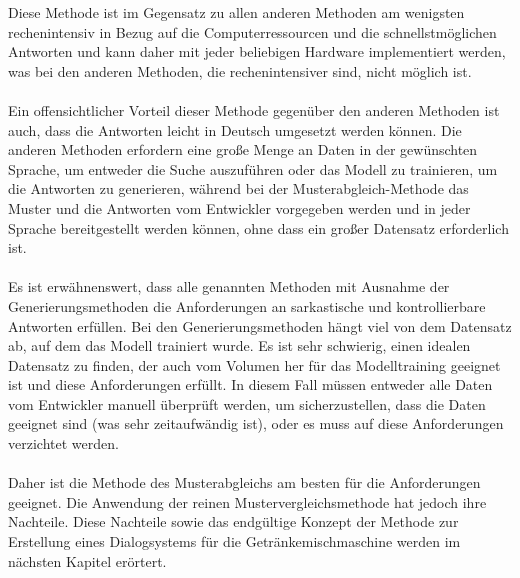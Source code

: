 Diese Methode ist im Gegensatz zu allen anderen Methoden am wenigsten rechenintensiv in Bezug auf die Computerressourcen und die schnellstmöglichen Antworten und kann daher mit jeder beliebigen Hardware implementiert werden, was bei den anderen Methoden, die rechenintensiver sind, nicht möglich ist.\\\\
Ein offensichtlicher Vorteil dieser Methode gegenüber den anderen Methoden ist auch, dass die Antworten leicht in Deutsch umgesetzt werden können. 
Die anderen Methoden erfordern eine große Menge an Daten in der gewünschten Sprache, um entweder die Suche auszuführen oder das Modell zu trainieren, um die Antworten zu generieren, während bei der Musterabgleich-Methode das Muster und die Antworten vom Entwickler vorgegeben werden und in jeder Sprache bereitgestellt werden können, ohne dass ein großer Datensatz erforderlich ist.\\\\
Es ist erwähnenswert, dass alle genannten Methoden mit Ausnahme der Generierungsmethoden die Anforderungen an sarkastische und kontrollierbare Antworten erfüllen. 
Bei den Generierungsmethoden hängt viel von dem Datensatz ab, auf dem das Modell trainiert wurde. 
Es ist sehr schwierig, einen idealen Datensatz zu finden, der auch vom Volumen her für das Modelltraining geeignet ist und diese Anforderungen erfüllt. 
In diesem Fall müssen entweder alle Daten vom Entwickler manuell überprüft werden, um sicherzustellen, dass die Daten geeignet sind (was sehr zeitaufwändig ist), oder es muss auf diese Anforderungen verzichtet werden.\\\\
Daher ist die Methode des Musterabgleichs am besten für die Anforderungen geeignet. 
Die Anwendung der reinen Mustervergleichsmethode hat jedoch ihre Nachteile. 
Diese Nachteile sowie das endgültige Konzept der Methode zur Erstellung eines Dialogsystems für die Getränkemischmaschine werden im nächsten Kapitel erörtert.
\endinput
